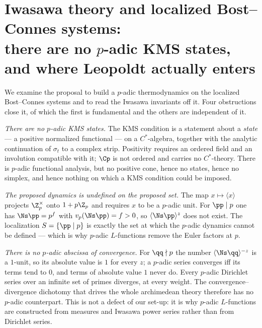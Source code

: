 \chapter[No $p$-adic KMS states]{Iwasawa theory and localized Bost--Connes systems:\\ there are no $p$-adic KMS states,\\ and where Leopoldt actually enters}\label{ch:XXII}
\begin{summary}
We examine the proposal to build a $p$-adic thermodynamics on the localized Bost--Connes
systems and to read the Iwasawa invariants off it. Four obstructions close it, of which the
first is fundamental and the others are independent of it.

\emph{There are no $p$-adic KMS states.} The KMS condition is a statement about a
\emph{state} --- a positive normalized functional --- on a $C^*$-algebra, together with the
analytic continuation of $\sigma_t$ to a complex strip. Positivity requires an ordered field
and an involution compatible with it; $\Cp$ is not ordered and carries no $C^*$-theory. There
is $p$-adic functional analysis, but no positive cone, hence no states, hence no simplex, and
hence nothing on which a KMS condition could be imposed.

\emph{The proposed dynamics is undefined on the proposed set.} The map $x\mapsto\langle x\rangle$
projects $\Z_p^\times$ onto $1+p\Z_p$ and requires $x$ to be a $p$-adic unit. For
$\pp\mid p$ one has $\Ns\pp=p^{f}$ with $v_p(\Ns\pp)=f>0$, so $\langle\Ns\pp\rangle^z$ does
not exist. The localization $S=\{\pp\mid p\}$ is exactly the set at which the $p$-adic
dynamics cannot be defined --- which is why $p$-adic $L$-functions remove the Euler factors
at $p$.

\emph{There is no $p$-adic abscissa of convergence.} For $\qq\nmid p$ the number
$\langle\Ns\qq\rangle^{-z}$ is a $1$-unit, so its absolute value is $1$ for every $z$;
a $p$-adic series converges iff its terms tend to $0$, and terms of absolute value $1$ never
do. Every $p$-adic Dirichlet series over an infinite set of primes diverges, at every weight.
The convergence--divergence dichotomy that drives the whole archimedean theory therefore has
no $p$-adic counterpart. This is not a defect of our set-up: it is why $p$-adic
$L$-functions are constructed from measures and Iwasawa power series rather than from
Dirichlet series.


\end{summary}
